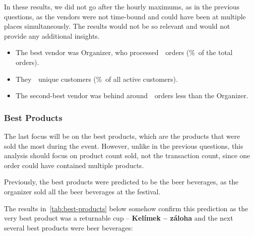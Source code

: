 In these results, we did not go after the hourly maximums, as in the previous questions, as the vendors were not time-bound and could have been at multiple places simultaneously.
The results would not be so relevant and would not provide any additional insights.

\begin{keytakeaways}
	\begin{itemize}
		\item The best vendor was Organizer, who processed~~orders (\%~of the total orders).
		\item They~~unique customers (\%~of all active customers).
		\item The second-best vendor was behind around~~orders less than the Organizer.
	\end{itemize}
\end{keytakeaways}


\subsubsection{Best Products}
\label{subsubsec:analysis-best-products}

The last focus will be on the best products, which are the products that were sold the most during the event.
However, unlike in the previous questions, this analysis should focus on product count sold, not the transaction count, since one order could have contained multiple products.


Previously, the best products were predicted to be the beer beverages, as the organizer sold all the beer beverages at the festival.

The results in~\autoref{tab:best-products} below somehow confirm this prediction as the very best product was a returnable cup – \textbf{Kelímek – záloha} and the next several best products were beer beverages:

